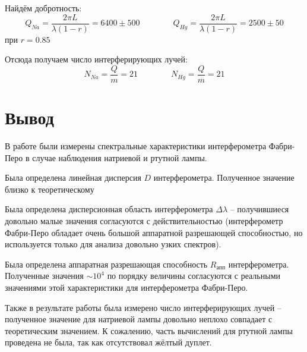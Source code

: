 \documentclass[a4paper,12pt]{article}
\theoremstyle{definition}
\begin{document}
Найдём добротность:
$$ Q_{Na} = \frac{2 \pi L}{\lambda (1 - r)} = 6400 \pm 500 \qquad \qquad Q_{Hg} = \frac{2 \pi L}{\lambda (1 - r)} = 2500 \pm 50 $$
при $ r = 0.85 $

Отсюда получаем число интерферирующих лучей: 
$$ N_{Na} = \frac{Q}{m} = 21 \qquad \qquad N_{Hg} = \frac{Q}{m} = 21 $$


\section{Вывод}
В работе были измерены спектральные характеристики интерферометра Фабри-Перо в случае наблюдения натриевой и ртутной лампы. 

Была определена линейная дисперсия $D$ интерферометра. Полученное значение близко к теоретическому

Была определена дисперсионная область интерферометра $\Delta \lambda$ -- получившиеся довольно малые значения согласуются с действительностью
(интерферометр Фабри-Перо обладает очень большой аппаратной разрешающей способностью, но используется только для анализа довольно узких спектров).

Была определена аппаратная разрешающая способность $R_{\text{апп}}$ интерферометра. Полученные значения $\sim 10^{4}$ по порядку величины согласуются с реальными значениями
этой характеристики для интерферометра Фабри-Перо.

Также в результате работы была измерено число интерферирующих лучей -- полученное значение для натриевой лампы довольно неплохо совпадает с
теоретическим значением. К сожалению, часть вычислений для ртутной лампы проведена не была, так как отсутствовал жёлтый дуплет.
\end{document}
